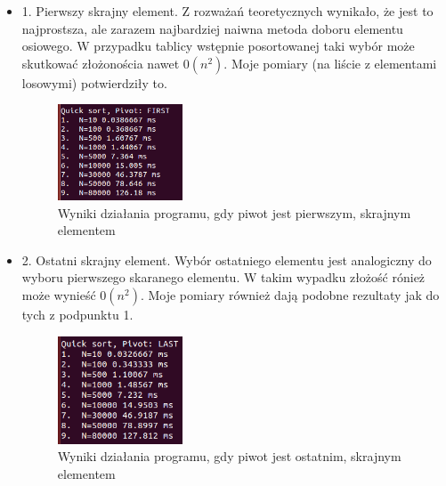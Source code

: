 \documentclass[11pt]{article}
\begin{document}
\begin{itemize}

\item 1. Pierwszy skrajny element. \newline
Z rozważań teoretycznych wynikało, że jest to najprostsza, ale zarazem najbardziej naiwna metoda doboru elementu osiowego. W przypadku tablicy wstępnie posortowanej taki wybór może skutkować złożonościa nawet \begin{math}0(n^{2})\end{math}. Moje pomiary (na liście z elementami losowymi) potwierdziły to.
\begin{figure}[ht]
\centering
\includegraphics[width=0.35\textwidth]{first.png}
\caption{Wyniki działania programu, gdy piwot jest pierwszym, skrajnym elementem}
\label{fig1}
\end{figure}

\item 2. Ostatni skrajny element. \newline
Wybór ostatniego elementu jest analogiczny do wyboru pierwszego skaranego elementu. W takim wypadku złożość rónież może wynieść \begin{math}0(n^{2})\end{math}. Moje pomiary również dają podobne rezultaty jak do tych z podpunktu 1.
\begin{figure}[ht]
\centering
\includegraphics[width=0.35\textwidth]{last.png}
\caption{Wyniki działania programu, gdy piwot jest ostatnim, skrajnym elementem}
\label{fig1}
\end{figure}


\end{itemize}
\end{document}
